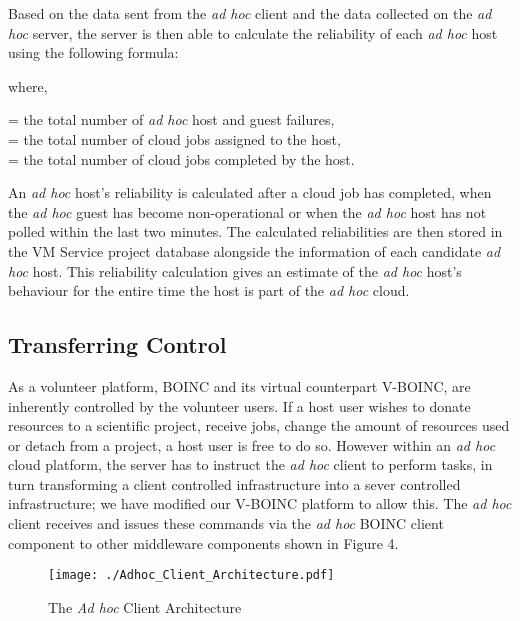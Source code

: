 \documentclass[10pt, conference, compsocconf]{IEEEtran}
\begin{document}
Based on the data sent from the \textit{ad hoc} client and the data collected on the \textit{ad hoc} server, the server is then able to calculate the reliability of each \textit{ad hoc} host using the following formula:


\noindent where,
\begin{center} = the total number of \textit{ad hoc} host and guest failures,\\
 = the total number of cloud jobs assigned to the host,\\
 = the total number of cloud jobs completed by the host.
\end{center}

\noindent An \textit{ad hoc} host's reliability is calculated after a cloud job has completed, when the \textit{ad hoc} guest has become non-operational or when the \textit{ad hoc} host has not polled within the last two minutes. The calculated reliabilities are then stored in the VM Service project database alongside the information of each candidate \textit{ad hoc} host. This reliability calculation gives an estimate of the \textit{ad hoc} host's behaviour for the entire time the host is part of the \textit{ad hoc} cloud.

\subsection{Transferring Control}
As a volunteer platform, BOINC and its virtual counterpart V-BOINC, are inherently controlled by the volunteer users. If a host user wishes to donate resources to a scientific project, receive jobs, change the amount of resources used or detach from a project, a host user is free to do so. However within an \textit{ad hoc} cloud platform, the server has to instruct the \textit{ad hoc} client to perform tasks, in turn transforming a client controlled infrastructure into a sever controlled infrastructure; we have modified our V-BOINC platform to allow this. The \textit{ad hoc} client receives and issues these commands via the \textit{ad hoc} BOINC client component to other middleware components shown in Figure 4. 

\begin{figure}[h!]
  \begin{center}
\texttt{[image: ./Adhoc\_Client\_Architecture.pdf]}
  \end{center}
 \caption{The \textit{Ad hoc} Client Architecture}
\end{figure}
\end{document}
